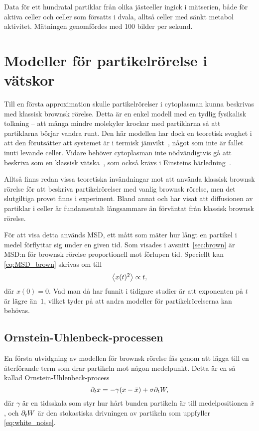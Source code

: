 Data för ett hundratal partiklar från olika jästceller ingick i mätserien, både för aktiva celler och celler som försatts i dvala, alltså celler med sänkt metabol aktivitet. Mätningen genomfördes med 100 bilder per sekund.



\section{Modeller för partikelrörelse i vätskor}

Till en första approximation skulle partikelrörelser i cytoplasman kunna beskrivas med klassisk brownsk rörelse. Detta är en enkel modell med en tydlig fysikalisk tolkning -- att många mindre molekyler krockar med partiklarna så att partiklarna börjar vandra runt. Den här modellen har dock en teoretisk svaghet i att den förutsätter att systemet är i termisk jämvikt~\cite{Einstein1905,Hofling&Franosch2013}, något som inte är fallet inuti levande celler. Vidare behöver cytoplasman inte nödvändigtvis gå att beskriva som en klassisk vätska\footnotemark{}~\cite{Midtveldt_etal2016}, som också krävs i Einsteins härledning~\cite{Einstein1905}.

Alltså finns redan vissa teoretiska invändningar mot att använda klassisk brownsk rörelse för att beskriva partikelrörelser med vanlig brownsk rörelse, men det slutgiltiga provet finns i experiment. 
Bland annat \cite{Parry_etal2014} och \cite{Midtveldt_etal2016} har visat att diffusionen av partiklar i celler är fundamentalt långsammare än förväntat från klassisk brownsk rörelse. 

För att visa detta används MSD, ett mått som mäter hur långt en partikel i medel förflyttar sig under en given tid. Som visades i avsnitt~\ref{sec:brown} är MSD:n för brownsk rörelse proportionell mot förlupen tid. Speciellt kan \eqref{eq:MSD_brown} skrivas om till
\begin{equation}
\ev{x(t)^2} \propto t,
\end{equation}
där $x(0)=0$. Vad man då har funnit i tidigare studier är att exponenten på $t$ är lägre än~$1$, vilket tyder på att andra modeller för partikelrörelserna kan behövas.


\subsection{Ornstein-Uhlenbeck-processen}
En första utvidgning av modellen för brownsk rörelse fås genom att lägga till en återförande term som drar partikeln mot någon medelpunkt. Detta är en så kallad Ornstein-Uhlenbeck-process
\begin{equation}\label{eq:SDE_o-u}
\partial_t x = -\gamma ( x-\bar{x} ) + \sigma\partial_t W,
\end{equation}
där $\gamma$ är en tidsskala som styr hur hårt bunden partikeln är till medelpositionen $\bar{x}$, och $\partial_t W$ är den stokastiska drivningen av partikeln som uppfyller \eqref{eq:white_noise}. 

